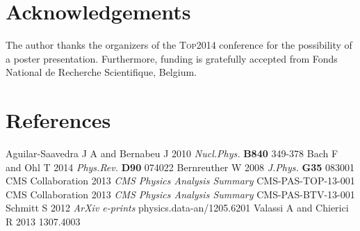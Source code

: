 \documentclass[a4paper]{jpconf}
\newcommand{\fixme}[1]{\textsc{\color{red}{\bf #1}}}
\begin{document}
\section{Acknowledgements}
The author thanks the organizers of the \textsc{Top2014} conference for the possibility of a poster presentation. Furthermore, funding is gratefully accepted from Fonds National de Recherche Scientifique, Belgium.


\section*{References}
\begin{thebibliography}{7}
 Aguilar-Saavedra J A and Bernabeu J 2010 {\it Nucl.Phys.} {\bf B840} 349-378 
 Bach F and Ohl T 2014 {\it Phys.Rev.} {\bf D90} 074022 
 Bernreuther W 2008 {\it J.Phys.} {\bf G35} 083001 
 CMS Collaboration 2013 {\it CMS Physics Analysis Summary} CMS-PAS-TOP-13-001
 CMS Collaboration 2013 {\it CMS Physics Analysis Summary} CMS-PAS-BTV-13-001
 Schmitt S 2012 {\it ArXiv e-prints} physics.data-an/1205.6201
 Valassi A and Chierici R 2013 1307.4003 \fixme{!!!TODO: MAKE THIS A REAL CITE!!!}
\end{thebibliography}
\end{document}
